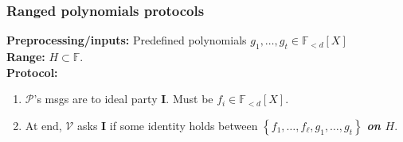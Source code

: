\documentclass[shadesubsections,compress,14pt,mathserif]{beamer}
\newcommand{\F}{\ensuremath{\mathbb F}}
\newcommand{\set}[1]{\ensuremath{\left\{#1\right\}}}
\newcommand{\ver}{\ensuremath{\mathcal{V}}}
\newcommand{\prv}{\ensuremath{\mathcal{P}}}
\newcommand{\polysofdeg}[1]{\F_{< #1}[X]}
\newcommand{\ideal}{\mathbf{I}}
\begin{document}
%  
%  
% 
% 
\begin{frame}
\frametitle{Ranged polynomials protocols}   %

\textbf{Preprocessing/inputs:} Predefined polynomials $g_1,\ldots,g_t\in \polysofdeg{d}$\\
\textbf{Range:} $H\subset\F$.\\ \pause
\vspace{0.4in}
\textbf{Protocol:}
 
 \begin{enumerate}

\item $\prv$'s  msgs are to ideal party $\ideal$. Must be $f_i\in \polysofdeg{d}$.\pause
\item At end, $\ver$ asks $\ideal$ if some identity holds between $\set{f_1,\ldots,f_\ell,g_1,\ldots,g_t}$   \textbf{\textit{on $H$}}. 

\end{enumerate}
\end{frame}
\end{document}
